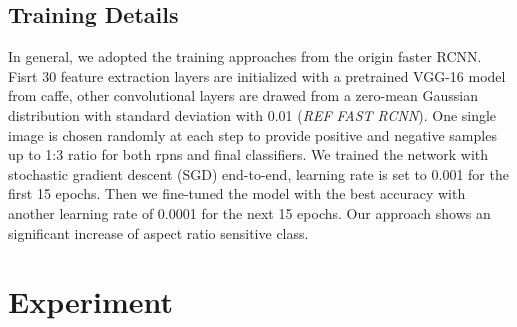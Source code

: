 \documentclass[10pt,twocolumn,letterpaper]{article}
\begin{document}
\subsection{Training Details}
In general, we adopted the training approaches from the origin faster RCNN. Fisrt 30 feature extraction layers are initialized with a pretrained VGG-16 model from caffe, other convolutional layers are drawed from a zero-mean Gaussian distribution with standard deviation with 0.01 (\emph{REF FAST RCNN}). One single image is chosen randomly at each step to provide positive and negative samples up to 1:3 ratio for both rpns and final classifiers. We trained the network with stochastic gradient descent (SGD) end-to-end, learning rate is set to 0.001 for the first 15 epochs. Then we fine-tuned the model with the best accuracy with another learning rate of 0.0001 for the next 15 epochs. Our approach shows an significant increase of aspect ratio sensitive class.


\begin{table}[ht]
\label{Exp1}
\centering
\caption{Comparison}
\end{table}

\section{Experiment}
\end{document}
